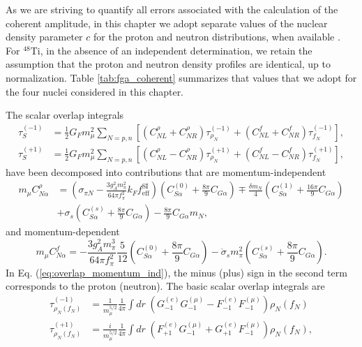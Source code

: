 \documentclass[12pt,letterpaper]{book}
\begin{document}
As we are striving to quantify all errors associated with the calculation of the coherent amplitude, in this chapter we adopt separate values of the nuclear density parameter $c$ for the proton and neutron distributions, when available \cite{Garcia-Recio:1991ocp}. For $^{48}$Ti, in the absence of an independent determination, we retain the assumption that the proton and neutron density profiles are identical, up to normalization. Table \ref{tab:fga_coherent} summarizes that values that we adopt for the four nuclei considered in this chapter.

The scalar overlap integrals 
\begin{equation}
\begin{split}
\tau_S^{(-1)}&=\frac{1}{2}G_Fm_{\mu}^2\sum_{N=p,n}\left[\left(C^{\rho}_{NL}+C^{\rho}_{NR}\right)\tau^{(-1)}_{\rho_N}+\left(C^f_{NL}+C^f_{NR}\right)\tau^{(-1)}_{f_N}\right],\\
\tau_S^{(+1)}&=\frac{1}{2}G_Fm_{\mu}^2\sum_{N=p,n}\left[\left(C_{NL}^{\rho}-C_{NR}^{\rho}\right)\tau_{\rho_N}^{(+1)}+\left(C_{NL}^f-C_{NR}^f\right)\tau_{f_N}^{(+1)}\right],
\end{split}
\end{equation}
have been decomposed into contributions that are momentum-independent
\begin{equation}
\begin{split}
m_{\mu}C_{N\alpha}^{\rho}&=\left(\sigma_{\pi N}-\frac{3g_A^2m_{\pi}^2}{64\pi f_{\pi}^2}k_Ff^\mathrm{SI}_\mathrm{eff}\right)\left(C_{S\alpha}^{(0)}+\frac{8\pi}{9}C_{G\alpha}\right)\mp\frac{\delta m_N}{4}\left(C_{S\alpha}^{(1)}+\frac{16\pi}{9}C_{G\alpha}\right)\\
&+\sigma_s\left(C_{S\alpha}^{(s)}+\frac{8\pi}{9}C_{G\alpha}\right)-\frac{8\pi}{9}C_{G\alpha}m_N,
\label{eq:overlap_momentum_ind}
\end{split}
\end{equation}
and momentum-dependent
\begin{equation}
m_{\mu}C_{N\alpha}^f=-\frac{3g_A^2m_{\pi}^3}{64\pi f_{\pi}^2}\frac{5}{12}\left(C_{S\alpha}^{(0)}+\frac{8\pi}{9}C_{G\alpha}\right)-\dot{\sigma}_sm_{\pi}^2\left(C_{S\alpha}^{(s)}+\frac{8\pi}{9}C_{G\alpha}\right).
\end{equation}
In Eq. (\ref{eq:overlap_momentum_ind}), the minus (plus) sign in the second term corresponds to the proton (neutron). The basic scalar overlap integrals are
\begin{equation}
\begin{split}
\tau^{(-1)}_{\rho_N(f_N)}&=\frac{1}{m_{\mu}^{5/2}}\frac{1}{4\pi}\int dr\;\left(G^{(e)}_{-1}G^{(\mu)}_{-1}-F_{-1}^{(e)}F_{-1}^{(\mu)}\right)\rho_N(f_N)\\
\tau^{(+1)}_{\rho_N(f_N)}&=\frac{i}{m_{\mu}^{5/2}}\frac{1}{4\pi}\int dr\;\left(F_{+1}^{(e)}G_{-1}^{(\mu)}+G_{+1}^{(e)}F_{-1}^{(\mu)}\right)\rho_N(f_N),
\end{split}
\end{equation}
\end{document}
